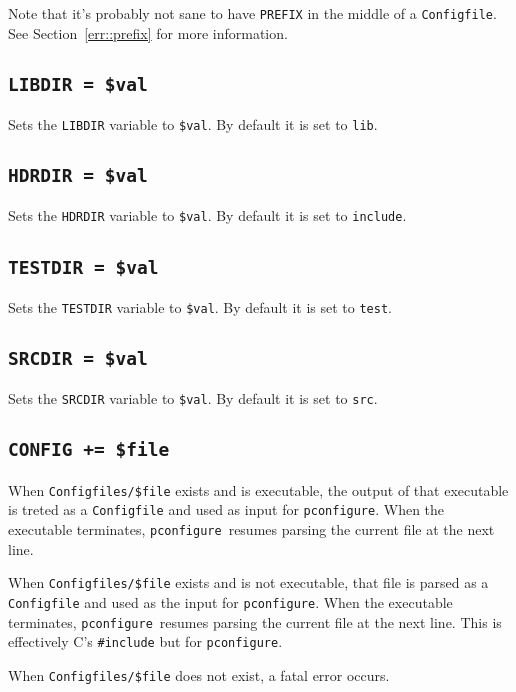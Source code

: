 \documentclass{article}
\newcommand{\pconfigure}{\texttt{pconfigure}}
\begin{document}
Note that it's probably not sane to have \texttt{PREFIX} in the middle
of a \texttt{Configfile}.  See Section~\ref{err::prefix} for more
information.

\subsection{\texttt{LIBDIR = \$val}}

Sets the \texttt{LIBDIR} variable to \texttt{\$val}.  By default it is
set to \texttt{lib}.

\subsection{\texttt{HDRDIR = \$val}}

Sets the \texttt{HDRDIR} variable to \texttt{\$val}.  By default it is
set to \texttt{include}.

\subsection{\texttt{TESTDIR = \$val}}

Sets the \texttt{TESTDIR} variable to \texttt{\$val}.  By default it is
set to \texttt{test}.

\subsection{\texttt{SRCDIR = \$val}}

Sets the \texttt{SRCDIR} variable to \texttt{\$val}.  By default it is
set to \texttt{src}.

\subsection{\texttt{CONFIG += \$file} \label{cmd:config}}

When \texttt{Configfiles/\$file} exists and is executable, the output
of that executable is treted as a \texttt{Configfile} and used as
input for \pconfigure.  When the executable terminates,
\pconfigure\ resumes parsing the current file at the next line.

When \texttt{Configfiles/\$file} exists and is not executable, that
file is parsed as a \texttt{Configfile} and used as the input for
\pconfigure.  When the executable terminates, \pconfigure\ resumes
parsing the current file at the next line.  This is effectively C's
\texttt{\#include} but for \pconfigure.

When \texttt{Configfiles/\$file} does not exist, a fatal error occurs.
\end{document}
